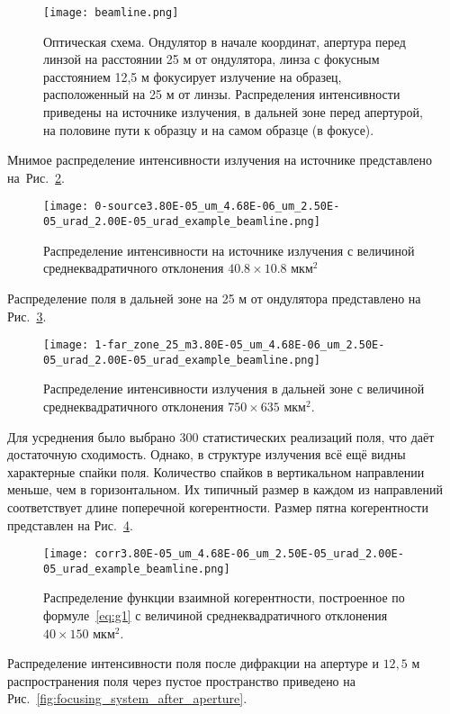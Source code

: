 \begin{figure}[H] 
	\centering 	\texttt{[image: beamline.png]}
	\caption{Оптическая схема. Ондулятор в начале координат, апертура перед линзой на расстоянии 25 м от ондулятора, линза с фокусным расстоянием 12,5 м фокусирует излучение на образец, расположенный на 25 м от линзы. Распределения интенсивности приведены на источнике излучения, в дальней зоне перед апертурой, на половине пути к образцу и на самом образце (в фокусе).}
	\label{fig:beamline}
\end{figure}
Мнимое распределение интенсивности излучения на источнике представлено на~Рис.~\ref{fig:focusing_system_source}.
\begin{figure}[H] 
	\centering 	\texttt{[image: 0-source3.80E-05\_um\_4.68E-06\_um\_2.50E-05\_urad\_2.00E-05\_urad\_example\_beamline.png]}
	\caption{Распределение интенсивности на источнике излучения с величиной среднеквадратичного отклонения $40.8 \times 10.8$ мкм$^2$}
	\label{fig:focusing_system_source}
\end{figure}
\noindent Распределение поля в дальней зоне на 25 м от ондулятора представлено на Рис.~\ref{fig:focusing_system_far_zone}.
\begin{figure}[H] 
	\centering 	\texttt{[image: 1-far\_zone\_25\_m3.80E-05\_um\_4.68E-06\_um\_2.50E-05\_urad\_2.00E-05\_urad\_example\_beamline.png]}
	\caption{Распределение интенсивности излучения в дальней зоне с величиной среднеквадратичного отклонения $750 \times 635$ мкм$^2$.}
	\label{fig:focusing_system_far_zone}
\end{figure}
\noindent Для усреднения было выбрано 300 статистических реализаций поля, что даёт достаточную сходимость. Однако, в структуре излучения всё ещё видны характерные спайки поля. Количество спайков в вертикальном направлении меньше, чем в горизонтальном. Их типичный размер в каждом из направлений соответствует длине поперечной когерентности. Размер пятна когерентности представлен на Рис.~\ref{fig:focusing_system_corr}.
\begin{figure}[H] 
	\centering 	\texttt{[image: corr3.80E-05\_um\_4.68E-06\_um\_2.50E-05\_urad\_2.00E-05\_urad\_example\_beamline.png]}
	\caption{Распределение функции взаимной когерентности, построенное по формуле~\ref{eq:g1} с величиной среднеквадратичного отклонения $40 \times 150 $ мкм$^2$.}
	\label{fig:focusing_system_corr}
\end{figure}
\noindent Распределение интенсивности поля после дифракции на апертуре и $12,5$ м распространения поля через пустое пространство приведено на Рис.~\ref{fig:focusing_system_after_aperture}.
